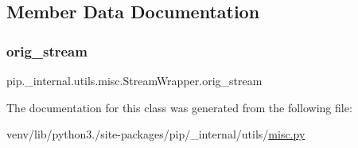 \subsection{Member Data Documentation}
\mbox{\label{classpip_1_1__internal_1_1utils_1_1misc_1_1StreamWrapper_a394dbf777e6d17f817cced11f0101b89}} 
\subsubsection{\texorpdfstring{orig\+\_\+stream}{orig\_stream}}
{\footnotesize\ttfamily pip.\+\_\+internal.\+utils.\+misc.\+Stream\+Wrapper.\+orig\+\_\+stream\hspace{0.3cm}{\ttfamily [static]}}



The documentation for this class was generated from the following file\+:\begin{DoxyCompactItemize}
\item 
venv/lib/python3./site-\/packages/pip/\+\_\+internal/utils/\hyperlink{pip_2__internal_2utils_2misc_8py}{misc.\+py}\end{DoxyCompactItemize}
